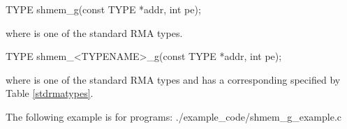 
\begin{apidefinition}

\begin{C11synopsis}
TYPE shmem_g(const TYPE *addr, int pe);
\end{C11synopsis}
where \TYPE{} is one of the standard \ac{RMA} types.

\begin{Csynopsis}
TYPE shmem_<TYPENAME>_g(const TYPE *addr, int pe);
\end{Csynopsis}
where \TYPE{} is one of the standard \ac{RMA} types and has a corresponding \TYPENAME{} specified by Table \ref{stdrmatypes}.

\begin{apiarguments}
\end{apiarguments}




\begin{apiexamples}

\apicexample
    {The following  example is for \CorCpp{} programs:}
    {./example_code/shmem_g_example.c}
    {}
\end{apiexamples}

\end{apidefinition}
